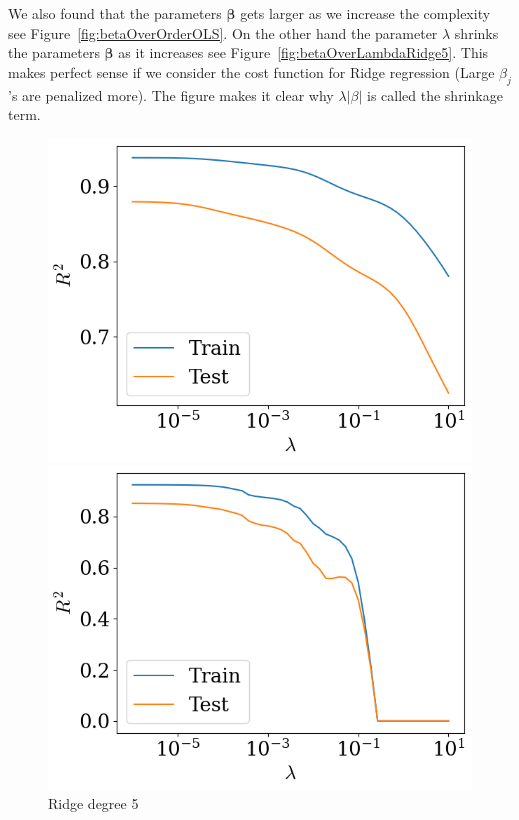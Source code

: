\documentclass[twoside,11pt]{report}
\begin{document}
We also found that the parameters $\boldsymbol{\beta}$ gets larger as we increase the complexity see Figure~\ref{fig:betaOverOrderOLS}. On the other hand
the parameter $\lambda$ shrinks the parameters $\boldsymbol{\beta}$ as it increases see Figure~\ref{fig:betaOverLambdaRidge5}. This makes perfect sense if we
consider the cost function for Ridge regression (Large $\beta_j$'s are penalized more). The figure makes it clear why $\lambda |\beta|$ is called the shrinkage
term.\\
\begin{figure}[!h]
\begin{minipage}[!t]{.48\linewidth}
    \begin{center}
        \includegraphics[width=1.0\textwidth]{../runsAndAdditions/R2OverLambdaRidge5.png}
        \caption{Ridge degree 5}\label{fig:R2OverLambdaRidge5}
\end{center}
\end{minipage}
\hspace{4mm}
\begin{minipage}[!t]{.48\linewidth}
    \begin{center}
        \includegraphics[width=1.0\textwidth]{../runsAndAdditions/R2OverLambdaLasso5.png}

\end{center}
\end{minipage}
\end{figure}
\end{document}
